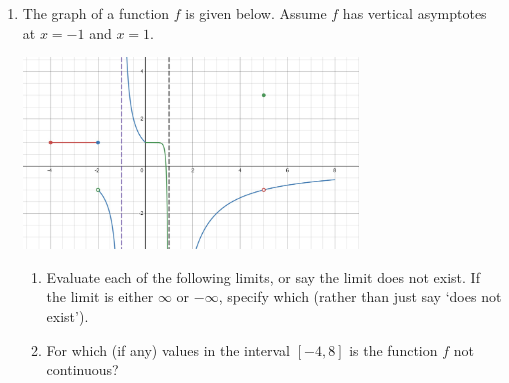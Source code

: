 \documentclass[12pt]{article}
\begin{document}
\begin{enumerate}
\item The graph of a function $f$ is given below. Assume $f$ has vertical asymptotes at $x=-1$ and $x=1$.
	\begin{center}
	\includegraphics[width = 0.7\textwidth]{Images/S24M241_PMT1_pic1.jpeg}
	\end{center}
	\begin{enumerate}
		\item  Evaluate each of the following limits, or say the limit does not exist. If the limit is either $\infty$ or $-\infty$, specify which (rather than just say `does not exist').
		\begin{enumerate}
		\end{enumerate}
		
		\item  For which (if any) values in the interval $[-4,8]$ is the function $f$ not continuous?
		\vfill
		

\end{enumerate}
\end{enumerate}
\end{document}
